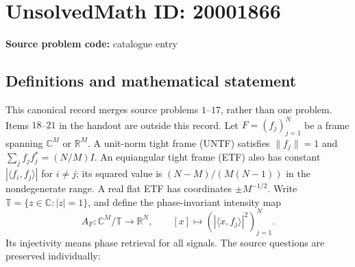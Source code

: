 \documentclass[11pt]{article}
\newcommand{\R}{\mathbb{R}}
\newcommand{\C}{\mathbb{C}}
\begin{document}
\section*{UnsolvedMath ID: 20001866}
\textbf{Source problem code:} catalogue entry
\subsection{Definitions and mathematical statement}
This canonical record merges source problems \(1\)--\(17\), rather than one problem. Items \(18\)--\(21\) in the handout are outside this record. Let \(F=(f_j)_{j=1}^N\) be a frame spanning \(\C^M\) or \(\R^M\). A unit-norm tight frame (UNTF) satisfies \(\|f_j\|=1\) and \(\sum_j f_jf_j^*=(N/M)I\). An equiangular tight frame (ETF) also has constant \(|\langle f_i,f_j\rangle|\) for \(i\ne j\); its squared value is \((N-M)/(M(N-1))\) in the nondegenerate range. A real flat ETF has coordinates \(\pm M^{-1/2}\). Write \(\mathbb T=\{z\in\C:|z|=1\}\), and define the phase-invariant intensity map
\[
 A_F:\C^M/\mathbb T\to\R^N,\qquad
 [x]\mapsto(|\langle x,f_j\rangle|^2)_{j=1}^N.
\]
Its injectivity means phase retrieval for all signals. The source questions are preserved individually:
\end{document}
